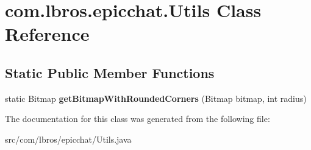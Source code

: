 \hypertarget{classcom_1_1lbros_1_1epicchat_1_1_utils}{\section{com.\-lbros.\-epicchat.\-Utils Class Reference}
\label{classcom_1_1lbros_1_1epicchat_1_1_utils}
}
\subsection*{Static Public Member Functions}
\begin{DoxyCompactItemize}
\item 
\hypertarget{classcom_1_1lbros_1_1epicchat_1_1_utils_acd3204f0626ae4b49d3ca0d315addae1}{static Bitmap {\bfseries get\-Bitmap\-With\-Rounded\-Corners} (Bitmap bitmap, int radius)}\label{classcom_1_1lbros_1_1epicchat_1_1_utils_acd3204f0626ae4b49d3ca0d315addae1}

\end{DoxyCompactItemize}


The documentation for this class was generated from the following file\-:\begin{DoxyCompactItemize}
\item 
src/com/lbros/epicchat/Utils.\-java\end{DoxyCompactItemize}
